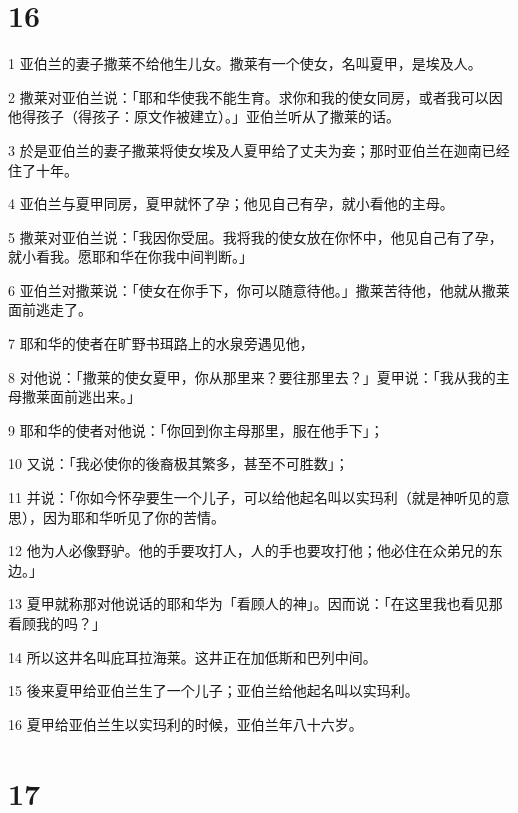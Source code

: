 \chapter{16}

\par 1 亚伯兰的妻子撒莱不给他生儿女。撒莱有一个使女，名叫夏甲，是埃及人。
\par 2 撒莱对亚伯兰说：「耶和华使我不能生育。求你和我的使女同房，或者我可以因他得孩子（得孩子：原文作被建立）。」亚伯兰听从了撒莱的话。
\par 3 於是亚伯兰的妻子撒莱将使女埃及人夏甲给了丈夫为妾；那时亚伯兰在迦南已经住了十年。
\par 4 亚伯兰与夏甲同房，夏甲就怀了孕；他见自己有孕，就小看他的主母。
\par 5 撒莱对亚伯兰说：「我因你受屈。我将我的使女放在你怀中，他见自己有了孕，就小看我。愿耶和华在你我中间判断。」
\par 6 亚伯兰对撒莱说：「使女在你手下，你可以随意待他。」撒莱苦待他，他就从撒莱面前逃走了。
\par 7 耶和华的使者在旷野书珥路上的水泉旁遇见他，
\par 8 对他说：「撒莱的使女夏甲，你从那里来？要往那里去？」夏甲说：「我从我的主母撒莱面前逃出来。」
\par 9 耶和华的使者对他说：「你回到你主母那里，服在他手下」；
\par 10 又说：「我必使你的後裔极其繁多，甚至不可胜数」；
\par 11 并说：「你如今怀孕要生一个儿子，可以给他起名叫以实玛利（就是神听见的意思），因为耶和华听见了你的苦情。
\par 12 他为人必像野驴。他的手要攻打人，人的手也要攻打他；他必住在众弟兄的东边。」
\par 13 夏甲就称那对他说话的耶和华为「看顾人的神」。因而说：「在这里我也看见那看顾我的吗？」
\par 14 所以这井名叫庇耳拉海莱。这井正在加低斯和巴列中间。
\par 15 後来夏甲给亚伯兰生了一个儿子；亚伯兰给他起名叫以实玛利。
\par 16 夏甲给亚伯兰生以实玛利的时候，亚伯兰年八十六岁。

\chapter{17}

